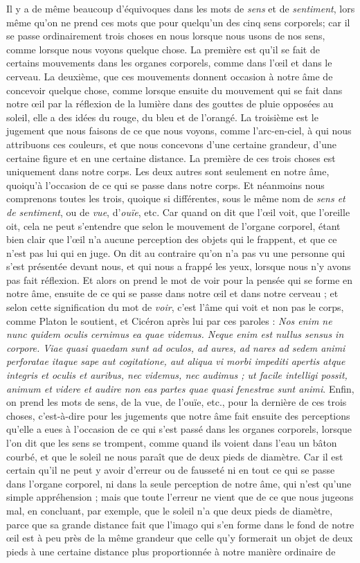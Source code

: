 Il y a de même beaucoup d'équivoques dans les mots de \emph{sens} et de \emph{sentiment}, lors même qu'on ne prend ces mots que pour quelqu'un des cinq sens corporels; car il se passe ordinairement trois choses en nous lorsque nous usons de nos sens, comme lorsque nous voyons quelque chose. La première est qu'il se fait de certains mouvements dans les organes corporels, comme dans l'œil et dans le cerveau. La deuxième, que ces mouvements donnent occasion à notre âme de concevoir quelque chose, comme lorsque ensuite du mouvement qui se fait dans notre œil par la réflexion de la lumière dans des gouttes de pluie opposées au soleil, elle a des idées du rouge, du bleu et de l'orangé. La troisième est le jugement que nous faisons de ce que nous voyons, comme l'arc-en-ciel, à qui nous attribuons ces couleurs, et que nous concevons d'une certaine grandeur, d'une certaine figure et en une certaine distance. La première de ces trois choses est uniquement dans notre corps. Les deux autres sont seulement en notre âme, quoiqu'à l'occasion de ce qui se passe dans notre corps. Et néanmoins nous comprenons toutes les trois, quoique si différentes, sous le même nom de \emph{sens et de sentiment}, ou de \emph{vue}, d'\emph{ouïe}, etc. Car quand on dit que l'œil voit, que l'oreille oit, cela ne peut s'entendre que selon le mouvement de l'organe corporel, étant bien clair que l'œil n'a aucune perception des objets qui le frappent, et que ce n'est pas lui qui en juge. On dit au contraire qu'on n'a pas vu une personne qui s'est présentée devant nous, et qui nous a frappé les yeux, lorsque nous n'y avons pas fait réflexion. Et alors on prend le mot de voir pour la pensée qui se forme en notre âme, ensuite de ce qui se passe dans notre œil et dans notre cerveau ; et selon cette signification du mot de \emph{voir}, c'est l'âme qui voit et non pas le corps, comme Platon le soutient, et Cicéron après lui par ces paroles : \emph{Nos enim ne nunc quidem oculis cernimus ea quae videmus. Neque enim est nullus sensus in corpore. Viae quasi quaedam sunt ad oculos, ad aures, ad nares ad sedem animi perforatae itaque sape aut cogitatione, aut aliqua vi morbi impediti apertis atque integris et oculis et auribus, nec videmus, nec audimus ; ut facile intelligi possit, animum et videre et audire non eas partes quae quasi fenestrae sunt animi}. Enfin, on prend les mots de sens, de la vue, de l'ouïe, etc., pour la dernière de ces trois choses, c'est-à-dire pour les jugements que notre âme fait ensuite des perceptions qu'elle a eues à l'occasion de ce qui s'est passé dans les organes corporels, lorsque l'on dit que les sens se trompent, comme quand ils voient dans l'eau un bâton courbé, et que le soleil ne nous paraît que de deux pieds de diamètre. Car il est certain qu'il ne peut y avoir d'erreur ou de fausseté ni en tout ce qui se passe dans l'organe corporel, ni dans la seule perception de notre âme, qui n'est qu'une simple appréhension ; mais que toute l'erreur ne vient que de ce que nous jugeons mal, en concluant, par exemple, que le soleil n'a que deux pieds de diamètre, parce que sa grande distance fait que l'imago qui s'en forme dans le fond de notre œil est à peu près de la même grandeur que celle qu'y formerait un objet de deux pieds à une certaine distance plus proportionnée à notre manière ordinaire de 